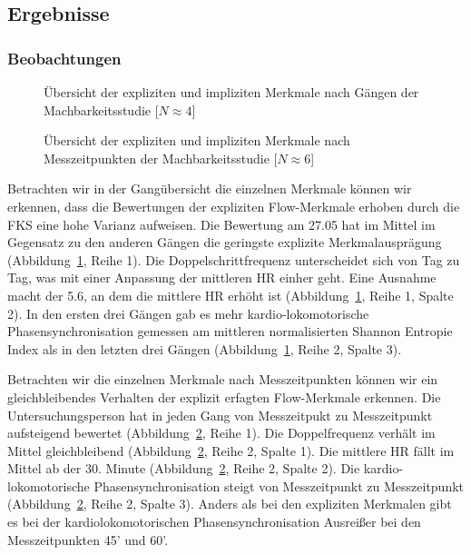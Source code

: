 \subsection{Ergebnisse} 

\label{sub:ergebnisse_5_2}

\subsubsection{Beobachtungen} 

\label{ssub:beobachtungen_5_2} 
\begin{figure}
	[!htb]  \caption[Übersicht der expliziten und impliziten Merkmale nach Gängen der Machbarkeitsstudie]{Übersicht der expliziten und impliziten Merkmale nach Gängen der Machbarkeitsstudie [$N \approx 4$]} \label{fig:ubersicht_nach_gangen_2} 
\end{figure}
\begin{figure}
	[!htb]  \caption[Übersicht der expliziten und impliziten Merkmale nach Messzeitpunkten der Machbarkeitsstudie]{Übersicht der expliziten und impliziten Merkmale nach Messzeitpunkten der Machbarkeitsstudie [$N \approx 6$]} \label{fig:ubersicht_nach_messzeitpunkten_2} 
\end{figure}

Betrachten wir in der Gangübersicht die einzelnen Merkmale können wir erkennen, dass die Bewertungen der expliziten Flow-Merkmale erhoben durch die \ac{FKS} eine hohe Varianz aufweisen. Die Bewertung am 27.05 hat im Mittel im Gegensatz zu den anderen Gängen die geringste explizite Merkmalausprägung (Abbildung~\ref{fig:ubersicht_nach_gangen_2}, Reihe 1). Die Doppelschrittfrequenz unterscheidet sich von Tag zu Tag, was mit einer Anpassung der mittleren \ac{HR} einher geht. Eine Ausnahme macht der 5.6, an dem die mittlere \ac{HR} erhöht ist (Abbildung~\ref{fig:ubersicht_nach_gangen_2}, Reihe 1, Spalte 2). In den ersten drei Gängen gab es mehr kardio-lokomotorische Phasensynchronisation gemessen am mittleren normalisierten Shannon Entropie Index als in den letzten drei Gängen (Abbildung~\ref{fig:ubersicht_nach_gangen_2}, Reihe 2, Spalte 3).

Betrachten wir die einzelnen Merkmale nach Messzeitpunkten können wir ein gleichbleibendes Verhalten der explizit erfagten Flow-Merkmale erkennen. Die Untersuchungsperson hat in jeden Gang von Messzeitpukt zu Messzeitpunkt aufsteigend bewertet (Abbildung~\ref{fig:ubersicht_nach_messzeitpunkten_2}, Reihe 1). Die Doppelfrequenz verhält im Mittel gleichbleibend (Abbildung~\ref{fig:ubersicht_nach_messzeitpunkten_2}, Reihe 2, Spalte 1). Die mittlere \ac{HR} fällt im Mittel ab der 30. Minute (Abbildung~\ref{fig:ubersicht_nach_messzeitpunkten_2}, Reihe 2, Spalte 2). Die kardio-lokomotorische Phasensynchronisation steigt von Messzeitpunkt zu Messzeitpunkt (Abbildung~\ref{fig:ubersicht_nach_messzeitpunkten_2}, Reihe 2, Spalte 3). Anders als bei den expliziten Merkmalen gibt es bei der kardiolokomotorischen Phasensynchronisation Ausreißer bei den Messzeitpunkten 45' und 60'. 

